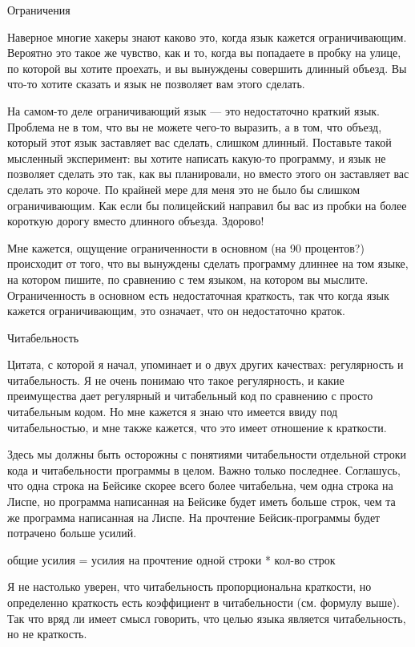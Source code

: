 \documentclass[ebook,12pt,oneside,openany]{memoir}
\begin{document}
Ограничения

Наверное многие хакеры знают каково это, когда язык кажется
ограничивающим. Вероятно это такое же чувство, как и то, когда вы
попадаете в пробку на улице, по которой вы хотите проехать, и вы
вынуждены совершить длинный объезд. Вы что-то хотите сказать и язык не
позволяет вам этого сделать.

На самом-то деле ограничивающий язык — это недостаточно краткий язык.
Проблема не в том, что вы не можете чего-то выразить, а в том, что
объезд, который этот язык заставляет вас сделать, слишком длинный.
Поставьте такой мысленный эксперимент: вы хотите написать какую-то
программу, и язык не позволяет сделать это так, как вы планировали, но
вместо этого он заставляет вас сделать это короче. По крайней мере для
меня это не было бы слишком ограничивающим. Как если бы полицейский
направил бы вас из пробки на более короткую дорогу вместо длинного
объезда. Здорово!

Мне кажется, ощущение ограниченности в основном (на 90 процентов?)
происходит от того, что вы вынуждены сделать программу длиннее на том
языке, на котором пишите, по сравнению с тем языком, на котором вы
мыслите. Ограниченность в основном есть недостаточная краткость, так
что когда язык кажется ограничивающим, это означает, что он
недостаточно краток.

Читабельность

Цитата, с которой я начал, упоминает и о двух других качествах:
регулярность и читабельность. Я не очень понимаю что такое
регулярность, и какие преимущества дает регулярный и читабельный код
по сравнению с просто читабельным кодом. Но мне кажется я знаю что
имеется ввиду под читабельностью, и мне также кажется, что это имеет
отношение к краткости.

Здесь мы должны быть осторожны с понятиями читабельности отдельной
строки кода и читабельности программы в целом. Важно только последнее.
Соглашусь, что одна строка на Бейсике скорее всего более читабельна,
чем одна строка на Лиспе, но программа написанная на Бейсике будет
иметь больше строк, чем та же программа написанная на Лиспе. На
прочтение Бейсик-программы будет потрачено больше усилий.

общие усилия = усилия на прочтение одной строки * кол-во строк


Я не настолько уверен, что читабельность пропорциональна краткости, но
определенно краткость есть коэффициент в читабельности (см. формулу
выше). Так что вряд ли имеет смысл говорить, что целью языка является
читабельность, но не краткость.
\end{document}
